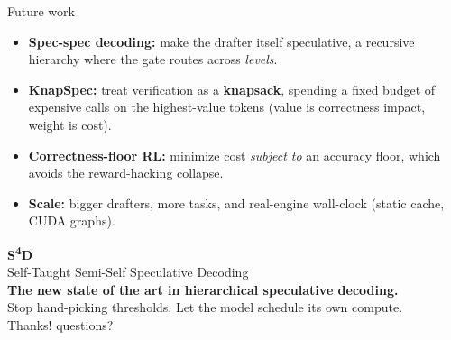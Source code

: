 \documentclass[aspectratio=169,11pt]{beamer}
\begin{document}
\begin{frame}{Future work}
\begin{itemize}
  \item \textbf{Spec-spec decoding:} make the drafter itself speculative, a recursive hierarchy where the gate routes across \emph{levels}.
  \item \textbf{KnapSpec:} treat verification as a \textbf{knapsack}, spending a fixed budget of expensive calls on the highest-value tokens (value is correctness impact, weight is cost).
  \item \textbf{Correctness-floor RL:} minimize cost \emph{subject to} an accuracy floor, which avoids the reward-hacking collapse.
  \item \textbf{Scale:} bigger drafters, more tasks, and real-engine wall-clock (static cache, CUDA graphs).
\end{itemize}
\end{frame}

\begin{frame}[plain]\centering\vfill
{\Large\textbf{S\textsuperscript{4}D}}\\[2pt]
{\normalsize Self-Taught Semi-Self Speculative Decoding}\\[4pt]
\textbf{The new state of the art in hierarchical speculative decoding.}\\[6pt]
Stop hand-picking thresholds. Let the model schedule its own compute.\\[8pt]
\footnotesize Thanks! \quad questions?
\vfill\end{frame}
\end{document}
